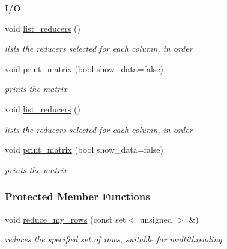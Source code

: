 \begin{Indent}\textbf{ I/O}\par
\begin{DoxyCompactItemize}
\item 
\mbox{\label{group___g_b_computation_af4491ffa78cb0e75051492b83f51744b}} 
void \hyperlink{group___g_b_computation_af4491ffa78cb0e75051492b83f51744b}{list\+\_\+reducers} ()
\begin{DoxyCompactList}\small\item\em lists the reducers selected for each column, in order \end{DoxyCompactList}\item 
void \hyperlink{group___g_b_computation_a9f3e9b5617084c34f97acd23d6e67a43}{print\+\_\+matrix} (bool show\+\_\+data=false)
\begin{DoxyCompactList}\small\item\em prints the matrix \end{DoxyCompactList}\item 
\mbox{\label{group___g_b_computation_af4491ffa78cb0e75051492b83f51744b}} 
void \hyperlink{group___g_b_computation_af4491ffa78cb0e75051492b83f51744b}{list\+\_\+reducers} ()
\begin{DoxyCompactList}\small\item\em lists the reducers selected for each column, in order \end{DoxyCompactList}\item 
void \hyperlink{group___g_b_computation_a9f3e9b5617084c34f97acd23d6e67a43}{print\+\_\+matrix} (bool show\+\_\+data=false)
\begin{DoxyCompactList}\small\item\em prints the matrix \end{DoxyCompactList}\end{DoxyCompactItemize}
\end{Indent}
\subsubsection*{Protected Member Functions}
\begin{DoxyCompactItemize}
\item 
\mbox{\label{group___g_b_computation_a5fc6f2417153c7c1dc9a77a3b7f42597}} 
void \hyperlink{group___g_b_computation_a5fc6f2417153c7c1dc9a77a3b7f42597}{reduce\+\_\+my\+\_\+rows} (const set$<$ unsigned $>$ \&)
\begin{DoxyCompactList}\small\item\em reduces the specified set of rows, suitable for multithreading \end{DoxyCompactList}\end{DoxyCompactItemize}
